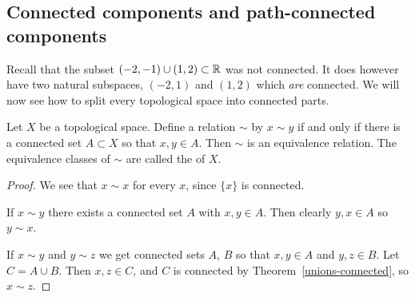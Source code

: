 \subsection{Connected components and path-connected components}
Recall that the subset $(-2,-1) \cup (1,2) \subset \mathbb{R}$ was not connected. It does however have two natural subspaces, $(-2,1)$ and $(1,2)$ which \emph{are} connected. We will now see how to split every topological space into connected parts.

\begin{prop}
  Let $X$ be a topological space. Define a relation $\sim$ by $x \sim y$ if and only if there is a connected set $A \subset X$ so that $x,y \in A$. Then $\sim$ is an equivalence relation. The equivalence classes of $\sim$ are called the  of $X$.
\end{prop}
\begin{proof}
  We see that $x \sim x$ for every $x$, since $\{x\}$ is connected.
  
  If $x \sim y$ there exists a connected set $A$ with $x,y \in A$. Then clearly $y,x \in A$ so $y \sim x$.
  
  If $x \sim y$ and $y \sim z$ we get connected sets $A$, $B$ so that $x,y \in A$ and $y,z \in B$. Let $C = A \cup B$. Then $x,z \in C$, and $C$ is connected by Theorem~\ref{unions-connected}, so $x \sim z$.
\end{proof}
